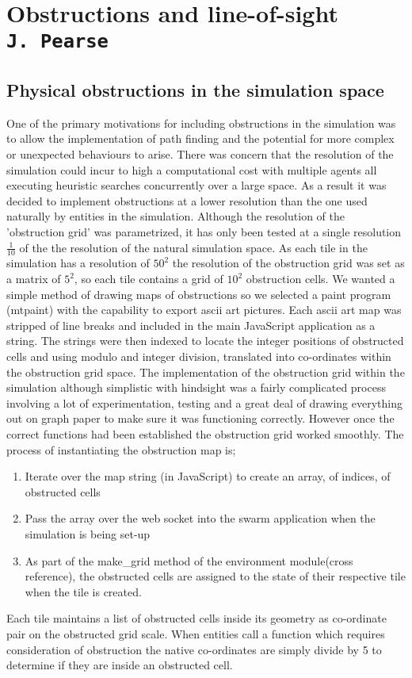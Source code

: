 \pagestyle{empty}

\section{Obstructions and line-of-sight\\{\small\tt{J.~Pearse}}}
\label{los}
\subsection{Physical obstructions in the simulation space}
One of the primary motivations for including obstructions in the simulation was to allow the implementation of path finding and the potential for more complex or unexpected behaviours to arise. There was concern that the resolution of the simulation could incur to high a computational cost with multiple agents all executing heuristic searches concurrently over a large space. As a result it was decided to implement obstructions at a lower resolution than the one used naturally by entities in the simulation. Although the resolution of the 'obstruction grid' was parametrized, it has only been tested at a single resolution \(\frac{1}{10}\) of the the resolution of the natural simulation space.
As each tile in the simulation has a resolution of \(50^2\) the resolution of the obstruction grid was set as a matrix of \(5^2\), so each tile contains a grid of \(10^2\) obstruction cells. We wanted a simple method of drawing maps of obstructions so we selected a paint program (mtpaint) with the capability to export ascii art pictures. Each ascii art map was stripped of line breaks and included in the main JavaScript application as a string. The strings were then indexed to locate the integer positions of obstructed cells and using modulo and integer division, translated into co-ordinates within the obstruction grid space. The implementation of the obstruction grid within the simulation although simplistic with hindsight was a fairly complicated process involving a lot of experimentation, testing and a great deal of drawing everything out on graph paper to make sure it was functioning correctly. However once the correct functions had been established the obstruction grid worked smoothly.
The process of instantiating the obstruction map is;
\begin{enumerate}
\item{Iterate over the map string (in JavaScript) to create an array, of indices, of obstructed cells}
\item{Pass the array over the web socket into the swarm application when the simulation is being set-up}
\item{As part of the make\_grid method of the environment module(cross reference), the obstructed cells are assigned to the state of their respective tile when the tile is created.}
\end{enumerate}
Each tile maintains a list of obstructed cells inside its geometry as co-ordinate pair on the obstructed grid scale.
When entities call a function which requires consideration of obstruction the native co-ordinates are simply divide by 5 to determine if they are inside an obstructed cell.

